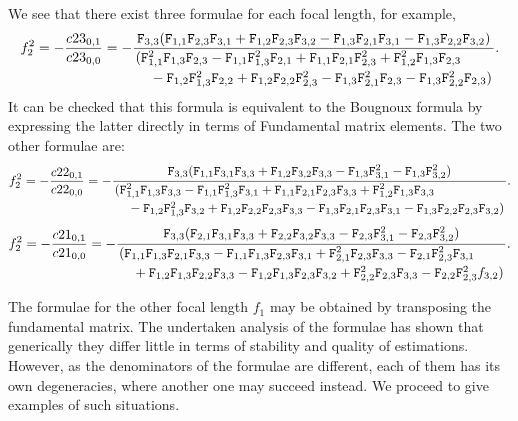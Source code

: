 We see that there exist three formulae for each focal length, for example, 
{\small
\begin{multline}
\label{eq:3}
f^2_2 = - \frac{c23_{0,1}}{c23_{0,0}} =  - \frac{\M{F}_{3,3} (\M{F}_{1,1} \M{F}_{2,3} \M{F}_{3,1}+\M{F}_{1,2} \M{F}_{2,3} \M{F}_{3,2}-\M{F}_{1,3} \M{F}_{2,1} \M{F}_{3,1}-\M{F}_{1,3} \M{F}_{2,2} \M{F}_{3,2})}{\splitdfrac{(\M{F}_{1,1}^2 \M{F}_{1,3} \M{F}_{2,3}-\M{F}_{1,1} \M{F}_{1,3}^2 \M{F}_{2,1}+\M{F}_{1,1} \M{F}_{2,1} \M{F}_{2,3}^2+\M{F}_{1,2}^2 \M{F}_{1,3} \M{F}_{2,3}}{-\M{F}_{1,2} \M{F}_{1,3}^2 \M{F}_{2,2}+\M{F}_{1,2} \M{F}_{2,2} \M{F}_{2,3}^2-\M{F}_{1,3} \M{F}_{2,1}^2 \M{F}_{2,3}-\M{F}_{1,3} \M{F}_{2,2}^2 \M{F}_{2,3})}}.
\end{multline}}
It can be checked that this formula is equivalent to the Bougnoux formula by expressing the latter directly in terms of Fundamental matrix elements. The two other formulae are: 
{\small
\begin{multline}
\label{eq:2}
f^2_2 = - \frac{c22_{0,1}}{c22_{0,0}} =- \dfrac{\M{F}_{3,3} (\M{F}_{1,1} \M{F}_{3,1} \M{F}_{3,3}+\M{F}_{1,2} \M{F}_{3,2} \M{F}_{3,3}-\M{F}_{1,3} \M{F}_{3,1}^2-\M{F}_{1,3} \M{F}_{3,2}^2)}{\splitdfrac{(\M{F}_{1,1}^2 \M{F}_{1,3} \M{F}_{3,3}-\M{F}_{1,1} \M{F}_{1,3}^2 \M{F}_{3,1}+\M{F}_{1,1} \M{F}_{2,1} \M{F}_{2,3} \M{F}_{3,3}+\M{F}_{1,2}^2 \M{F}_{1,3} \M{F}_{3,3}}{-\M{F}_{1,2} \M{F}_{1,3}^2 \M{F}_{3,2}+\M{F}_{1,2} \M{F}_{2,2} \M{F}_{2,3} \M{F}_{3,3}-\M{F}_{1,3} \M{F}_{2,1} \M{F}_{2,3} \M{F}_{3,1}-\M{F}_{1,3} \M{F}_{2,2} \M{F}_{2,3} \M{F}_{3,2})}}.
\end{multline}}
{\small
\begin{multline}
\label{eq:1}
f^2_2 = - \frac{c21_{0,1}}{c21_{0,0}}  =-\dfrac{\M{F}_{3,3} (\M{F}_{2,1} \M{F}_{3,1} \M{F}_{3,3}+\M{F}_{2,2} \M{F}_{3,2} \M{F}_{3,3}-\M{F}_{2,3} \M{F}_{3,1}^2-\M{F}_{2,3} \M{F}_{3,2}^2)}{\splitdfrac{(\M{F}_{1,1} \M{F}_{1,3} \M{F}_{2,1} \M{F}_{3,3}-\M{F}_{1,1} \M{F}_{1,3} \M{F}_{2,3} \M{F}_{3,1}+\M{F}_{2,1}^2 \M{F}_{2,3} \M{F}_{3,3}-\M{F}_{2,1} \M{F}_{2,3}^2 \M{F}_{3,1}}{+\M{F}_{1,2} \M{F}_{1,3} \M{F}_{2,2} \M{F}_{3,3}-\M{F}_{1,2} \M{F}_{1,3} \M{F}_{2,3} \M{F}_{3,2}+\M{F}_{2,2}^2 \M{F}_{2,3} \M{F}_{3,3}-\M{F}_{2,2} \M{F}_{2,3}^2 f_{3,2})}}.
\end{multline}}

The formulae for the other focal length $f_1$ may be obtained by transposing the fundamental matrix. The undertaken analysis of the formulae has shown that generically they differ little in terms of stability and quality of estimations. However, as the denominators of the formulae are different, each of them has its own degeneracies, where another one may succeed instead.
We proceed to give examples of such situations.

